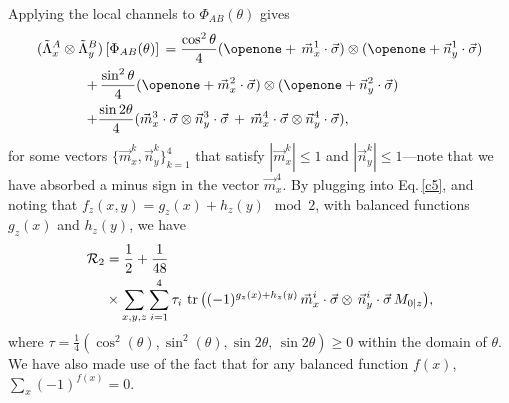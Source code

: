 \documentclass[aps,superscriptaddress,twocolumn,twoside,floatfix,pra,nofootinbib,a4paper]{revtex4-2}
\begin{document}

Applying the local channels to $\Phi_{AB}(\theta)$ gives
\begin{align}
	(\tilde{\Lambda}^A_{x} \otimes \tilde{\Lambda}^B_{y}&)\, [\Phi_{AB}(\theta)] \,=\frac{\cos^2{\theta}}{4}(\openone+\,\vec{m}^{1}_{x}\cdot\vec{\sigma} )\otimes (\openone+\vec{n}^{1}_{y}\cdot\vec{\sigma} ) \nonumber\\
+&\,\frac{\sin^2{\theta} }{4}(\openone+\vec{m}^{2}_{x}\cdot\vec{\sigma})\otimes (\openone+\vec{n}^{2}_{y}\cdot\vec{\sigma})\nonumber\\
 +& \frac{\sin{2\theta}}{4}(\vec{m}_{x}^{3}\cdot\vec{\sigma}\otimes \vec{n}_{y}^{3}\cdot\vec{\sigma} \,+\, \vec{m}_{x}^{4}\cdot \vec{\sigma} \otimes \vec{n}_{y}^{4}\cdot\vec{\sigma} ),
 \label{eq: Pure state Pauli after channel}
\end{align}
for some vectors $\{\vec{m}^{k}_{x}, \vec{n}^{k}_{y}\}_{k=1}^4$ that satisfy $|\vec{m}^{k}_{x}|\leq 1$ and $|\vec{n}^{k}_{y}|\leq 1$---note that we have absorbed a minus sign in the vector $\vec m_x^4$.
By plugging into Eq.\,\eqref{c5}, and noting that $f_z(x,y) = g_z(x) + h_z(y) \mod{2}$, with balanced functions $g_z(x)$ and $h_z(y)$, we have
\begin{align}
 	\mathcal{R}_2&
 =\frac{1}{2}+\frac{1}{48}\\
 &\times \sum_{x,y,z} \nonumber\sum_{i=1}^{4}\tau_i \,\tr\big((-1)^{g_z(x) + h_z(y)}\,  \vec{m}_{x}^i\cdot\vec{\sigma} \otimes\, \vec{n}_{y}^i\cdot \vec{\sigma} \, M_{0|z}\big),
\end{align}
where $  \tau= \frac{1}{4}(\cos^2(\theta),\sin^2(\theta),\sin{2\theta},\,\sin{2\theta})\geq 0$ within the domain of $\theta$. 
We have also made use of the fact that for any balanced function $f(x)$, $\sum_{x}(-1)^{f(x)}=0 .$ 
\end{document}
